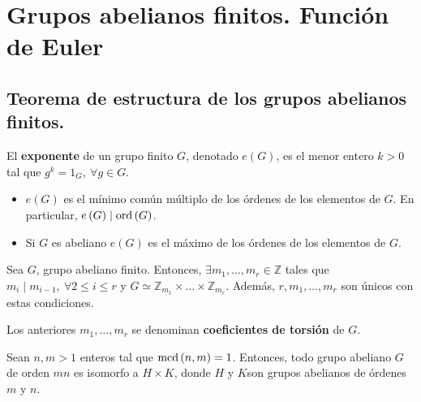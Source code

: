 \chapter{Grupos abelianos finitos. Función\texorpdfstring{\\}{} de Euler}
\section{Teorema de estructura de los grupos abelianos finitos.}
    \begin{defi}[Exponente]
        El \textbf{exponente} de un grupo finito $G$, denotado $e\left( G \right)$, es el menor entero $k > 0$ tal que $g^k = 1_G,\ \forall g \in G$.
    \end{defi}

    \begin{prop}
        \begin{itemize}
        \item $e\left( G \right)$ es el mínimo común múltiplo de los órdenes de los elementos de $G$. En particular, $e\left( G \right) \mid \operatorname{ord}\left( G \right)$.
        \item Si $G$ es abeliano $e\left( G \right)$ es el máximo de los órdenes de los elementos de $G$.
        \end{itemize}
    \end{prop}

    \begin{theo}
        Sea $G$, grupo abeliano finito. Entonces, $\exists m_1, \ldots, m_r \in \mathbb{Z}$ tales que $m_i \mid m_{i-1},\ \forall 2 \le i \le r$ y $G \simeq \mathbb{Z}_{m_1} \times \ldots \times \mathbb{Z}_{m_r}$. Además, $r, m_1, \ldots, m_r$ son únicos con estas condiciones.
    \end{theo}

    \begin{defi}
        Los anteriores $m_1, \ldots, m_r$ se denominan \textbf{coeficientes de torsión} de $G$.
    \end{defi}

    \begin{prop}
        Sean $n, m > 1$ enteros tal que $\operatorname{mcd} \left( n, m \right) = 1$. Entonces, todo grupo abeliano $G$ de orden $mn$ es isomorfo a $H \times K$, donde $H$ y $K$son grupos abelianos de órdenes $m$ y $n$.
    \end{prop}
